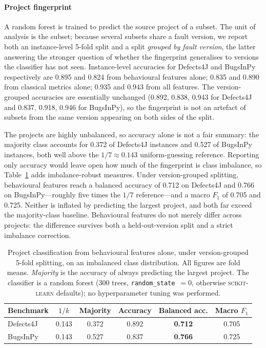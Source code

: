 \documentclass[preprint,12pt]{elsarticle}
\begin{document}
\paragraph{Project fingerprint} A random forest is trained to predict the
source project of a subset. The unit of analysis is the subset; because
several subsets share a fault version, we report both an instance-level
5-fold split and a split \emph{grouped by fault version}, the latter
answering the stronger question of whether the fingerprint generalises to
versions the classifier has not seen. Instance-level accuracies for
Defects4J and BugsInPy respectively are \num{0.895} and \num{0.824} from
behavioural features alone; \num{0.835} and \num{0.890} from classical
metrics alone; \num{0.935} and \num{0.943} from all features. The
version-grouped accuracies are
essentially unchanged (\num{0.892}, \num{0.838}, \num{0.943} for
Defects4J and \num{0.837}, \num{0.918}, \num{0.946} for BugsInPy), so
the fingerprint is not an artefact of subsets from the same version
appearing on both sides of the split.

The projects are highly unbalanced, so accuracy alone is not a fair
summary: the majority class accounts for \num{0.372} of Defects4J
instances and \num{0.527} of BugsInPy instances, both well above the
$1/7 \approx \num{0.143}$ uniform-guessing reference. Reporting only
accuracy would leave open how much of the fingerprint is class imbalance,
so Table~\ref{tab:fingerprint} adds imbalance-robust measures. Under
version-grouped splitting, behavioural features reach a balanced accuracy
of \num{0.712} on Defects4J and \num{0.766} on BugsInPy---roughly five
times the $1/7$ reference---and a macro $F_1$ of \num{0.705} and
\num{0.725}. Neither is inflated by predicting the largest project, and
both far exceed the majority-class baseline. Behavioural features do not
merely differ across projects: the difference survives both a held-out-version
split and a strict imbalance correction.

\begin{table}[t]
\centering
\caption{Project classification from behavioural features alone, under
version-grouped 5-fold splitting, on an imbalanced class distribution. All
figures are fold means. \emph{Majority} is the accuracy of always predicting
the largest project. The classifier is a random forest (\num{300} trees,
\texttt{random\_state}~$=0$, otherwise \textsc{scikit-learn} defaults); no
hyperparameter tuning was performed.}
\label{tab:fingerprint}
\begin{tabular}{lccccc}
\toprule
Benchmark & $1/k$ & Majority & Accuracy & Balanced acc. & Macro $F_1$ \\
\midrule
Defects4J & 0.143 & 0.372 & 0.892 & \textbf{0.712} & 0.705 \\
BugsInPy  & 0.143 & 0.527 & 0.837 & \textbf{0.766} & 0.725 \\
\bottomrule
\end{tabular}
\end{table}
\end{document}
